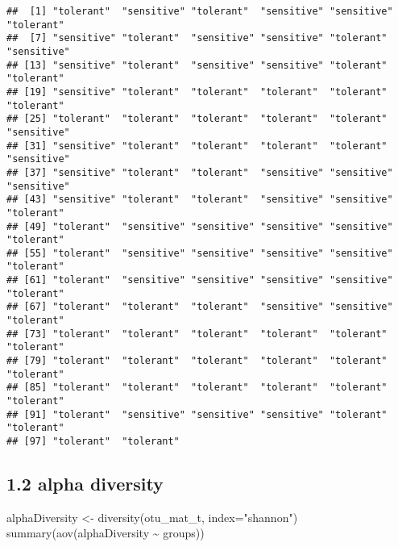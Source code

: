 \documentclass[
]{article}
\newenvironment{Shaded}{\begin{snugshade}}{\end{snugshade}}
\newcommand{\AttributeTok}[1]{\textcolor[rgb]{0.77,0.63,0.00}{#1}}
\newcommand{\CommentTok}[1]{\textcolor[rgb]{0.56,0.35,0.01}{\textit{#1}}}
\newcommand{\FunctionTok}[1]{\textcolor[rgb]{0.00,0.00,0.00}{#1}}
\newcommand{\NormalTok}[1]{#1}
\newcommand{\OtherTok}[1]{\textcolor[rgb]{0.56,0.35,0.01}{#1}}
\newcommand{\SpecialCharTok}[1]{\textcolor[rgb]{0.00,0.00,0.00}{#1}}
\newcommand{\StringTok}[1]{\textcolor[rgb]{0.31,0.60,0.02}{#1}}
\begin{document}
\begin{Shaded}
\end{Shaded}

\begin{verbatim}
##  [1] "tolerant"  "sensitive" "tolerant"  "sensitive" "sensitive" "tolerant" 
##  [7] "sensitive" "tolerant"  "sensitive" "sensitive" "tolerant"  "sensitive"
## [13] "sensitive" "tolerant"  "sensitive" "sensitive" "tolerant"  "tolerant" 
## [19] "sensitive" "tolerant"  "tolerant"  "tolerant"  "tolerant"  "tolerant" 
## [25] "tolerant"  "tolerant"  "tolerant"  "tolerant"  "tolerant"  "sensitive"
## [31] "sensitive" "tolerant"  "tolerant"  "tolerant"  "tolerant"  "sensitive"
## [37] "sensitive" "tolerant"  "tolerant"  "sensitive" "sensitive" "sensitive"
## [43] "sensitive" "tolerant"  "tolerant"  "sensitive" "sensitive" "tolerant" 
## [49] "tolerant"  "sensitive" "sensitive" "sensitive" "sensitive" "tolerant" 
## [55] "tolerant"  "sensitive" "sensitive" "sensitive" "sensitive" "tolerant" 
## [61] "tolerant"  "sensitive" "sensitive" "sensitive" "sensitive" "tolerant" 
## [67] "tolerant"  "tolerant"  "tolerant"  "sensitive" "sensitive" "tolerant" 
## [73] "tolerant"  "tolerant"  "tolerant"  "tolerant"  "tolerant"  "tolerant" 
## [79] "tolerant"  "tolerant"  "tolerant"  "tolerant"  "tolerant"  "tolerant" 
## [85] "tolerant"  "tolerant"  "tolerant"  "tolerant"  "tolerant"  "tolerant" 
## [91] "tolerant"  "sensitive" "sensitive" "sensitive" "tolerant"  "tolerant" 
## [97] "tolerant"  "tolerant"
\end{verbatim}

\hypertarget{alpha-diversity}{%
\subsection{1.2 alpha diversity}\label{alpha-diversity}}

\begin{Shaded}
\begin{Highlighting}[]
\NormalTok{alphaDiversity }\OtherTok{\textless{}{-}} \FunctionTok{diversity}\NormalTok{(otu\_mat\_t, }\AttributeTok{index=}\StringTok{"shannon"}\NormalTok{)}
\FunctionTok{summary}\NormalTok{(}\FunctionTok{aov}\NormalTok{(alphaDiversity }\SpecialCharTok{\textasciitilde{}}\NormalTok{ groups))}
\end{Highlighting}
\end{Shaded}
\end{document}
